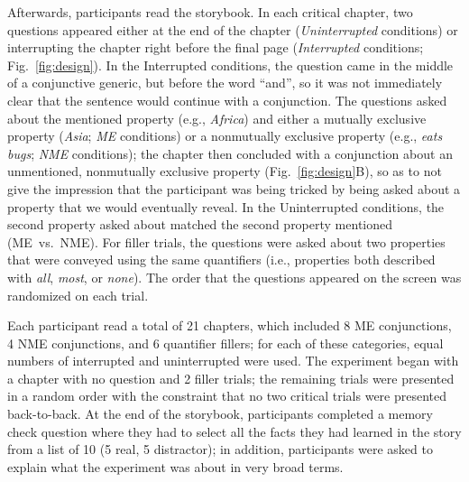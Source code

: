 \documentclass[10pt,letterpaper]{article}
\newcommand{\red}[1]{{\textcolor{Red}{#1}}}
\begin{document}
Afterwards, participants read the storybook.
In each critical chapter, two questions appeared either at the end of the chapter (\emph{Uninterrupted} conditions) or interrupting the chapter right before the final page  (\emph{Interrupted} conditions; Fig.~\ref{fig:design}).
In the Interrupted conditions, the question came in the middle of a conjunctive generic, but before the word ``and'', so it was not immediately clear that the sentence would continue with a conjunction.
The questions asked about the mentioned property (e.g., \emph{Africa}) and either a mutually exclusive property (\emph{Asia}; \emph{ME} conditions) or a nonmutually exclusive property (e.g., \emph{eats bugs}; \emph{NME} conditions); the chapter then concluded with a conjunction about an unmentioned, nonmutually exclusive property (Fig.~\ref{fig:design}B), so as to not give the impression that the participant was being tricked by being asked about a property that we would eventually reveal.
In the Uninterrupted conditions,  the second property asked about matched the second property mentioned (ME~vs.~NME). 
For filler trials, the questions were asked about two properties that were conveyed using the same quantifiers (i.e., properties both described with \emph{all}, \emph{most}, or \emph{none}).
The order that the questions appeared on the screen was randomized on each trial.

Each participant read a total of 21 chapters, which included 8 ME conjunctions, 4 NME conjunctions, and 6 quantifier fillers; for each of these categories, equal numbers of interrupted and uninterrupted were used. 
The experiment began with a chapter with no question and 2 filler trials; the remaining trials were presented in a random order with the constraint that no two critical trials were presented back-to-back. 
At the end of the storybook, participants completed a memory check question where they had to select all the facts they had learned in the story from a list of 10 (5 real, 5 distractor); in addition, participants were asked to explain what the experiment was about in very broad terms.

\end{document}

